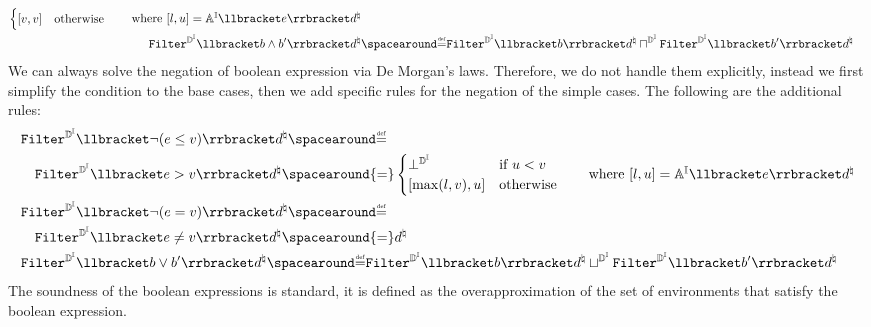 \begin{description}
\begin{align*}
\begin{cases}
      \interval{\defvalue}{\defvalue} & \text{otherwise}
    \end{cases} \tag*{where $\interval{l}{u} = \intervalaexp \semanticsof{\defaexp} \defabstractvalue$} \\
    \intervalabstractdomainfilter \semanticsof{\defbexp \land \defbexp'} \defabstractvalue &\DefeQ \intervalabstractdomainfilter \semanticsof{\defbexp} \defabstractvalue \intervalabstractdomainmeet \intervalabstractdomainfilter \semanticsof{\defbexp'} \defabstractvalue
  \end{align*}
  We can always solve the negation of boolean expression via De Morgan's laws.
  Therefore, we do not handle them explicitly, instead we first simplify the condition to the base cases, then we add specific rules for the negation of the simple cases. The following are the additional rules:
  \begin{align*}
    &\intervalabstractdomainfilter \semanticsof{\neg(\defaexp \le \defvalue)} \defabstractvalue \DefeQ \\
    &\quad\intervalabstractdomainfilter \semanticsof{\defaexp > \defvalue} \defabstractvalue \spacearound{=}\begin{cases}
      \intervalabstractdomainbottom & \text{if } u < \defvalue \\
      \interval{\max(l, \defvalue)}{u} & \text{otherwise}
    \end{cases} \tag*{where $\interval{l}{u} = \intervalaexp \semanticsof{\defaexp} \defabstractvalue$} \\
    &\intervalabstractdomainfilter \semanticsof{\neg(\defaexp = \defvalue)} \defabstractvalue \DefeQ \\
    &\quad\intervalabstractdomainfilter \semanticsof{\defaexp \neq \defvalue} \defabstractvalue \spacearound{=} \defabstractvalue \\
    &\intervalabstractdomainfilter \semanticsof{\defbexp \lor \defbexp'} \defabstractvalue \DefeQ \intervalabstractdomainfilter \semanticsof{\defbexp} \defabstractvalue \intervalabstractdomainjoin \intervalabstractdomainfilter \semanticsof{\defbexp'} \defabstractvalue
  \end{align*}
  The soundness of the boolean expressions is standard, it is defined as the overapproximation of the set of environments that satisfy the boolean expression.

\end{description}
